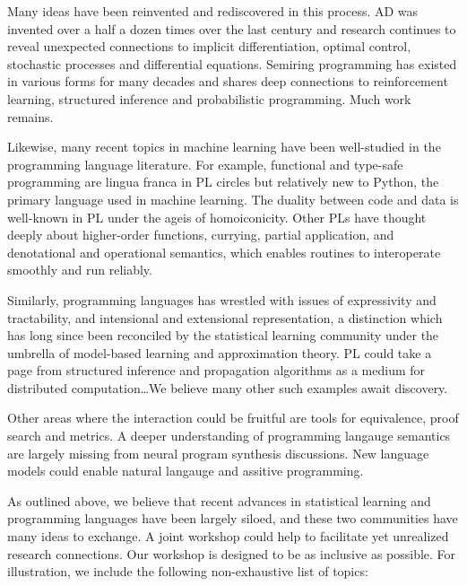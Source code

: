 \documentclass{article}
\begin{document}
    Many ideas have been reinvented and rediscovered in this process. AD was invented over a half a dozen times over the last century and research continues to reveal unexpected connections to implicit differentiation, optimal control, stochastic processes and differential equations. Semiring programming has existed in various forms for many decades and shares deep connections to reinforcement learning, structured inference and probabilistic programming. Much work remains.

    Likewise, many recent topics in machine learning have been well-studied in the programming language literature. For example, functional and type-safe programming are lingua franca in PL circles but relatively new to Python, the primary language used in machine learning. The duality between code and data is well-known in PL under the ageis of homoiconicity. Other PLs have thought deeply about higher-order functions, currying, partial application, and denotational and operational semantics, which enables routines to interoperate smoothly and run reliably.

    Similarly, programming languages has wrestled with issues of expressivity and tractability, and intensional and extensional representation, a distinction which has long since been reconciled by the statistical learning community under the umbrella of model-based learning and approximation theory. PL could take a page from structured inference and propagation algorithms as a medium for distributed computation\ldots We believe many other such examples await discovery.

    Other areas where the interaction could be fruitful are tools for equivalence, proof search and metrics. A deeper understanding of programming langauge semantics are largely missing from neural program synthesis discussions. New language models could enable natural langauge and assitive programming.

    As outlined above, we believe that recent advances in statistical learning and programming languages have been largely siloed, and these two communities have many ideas to exchange. A joint workshop could help to facilitate yet unrealized research connections. Our workshop is designed to be as inclusive as possible. For illustration, we include the following non-exhaustive list of topics:
\end{document}

